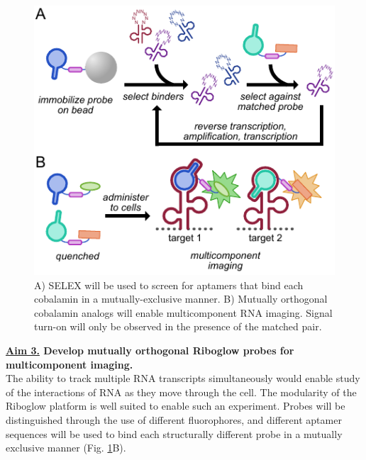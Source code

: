 \begin{figure}
\begin{centering}
\includegraphics[width=\textwidth]{figures/aim3v2.pdf}
\end{centering}
\footnotesize
\caption{\label{figure:aim3}
A) SELEX will be used to screen for aptamers that bind each cobalamin in a mutually-exclusive manner. B) Mutually orthogonal cobalamin analogs will enable multicomponent RNA imaging. Signal turn-on will only be observed in the presence of the matched pair.
}
\end{figure}

\textbf{\underline{Aim 3.} Develop mutually orthogonal Riboglow probes for multicomponent imaging.}\\
The ability to track multiple RNA transcripts simultaneously would enable study of the interactions of RNA as they move through the cell. 
The modularity of the Riboglow platform is well suited to enable such an experiment. Probes will be distinguished through the use of different fluorophores, and different aptamer sequences will be used to bind each structurally different probe in a mutually exclusive manner (Fig. \ref{figure:aim3}B).

